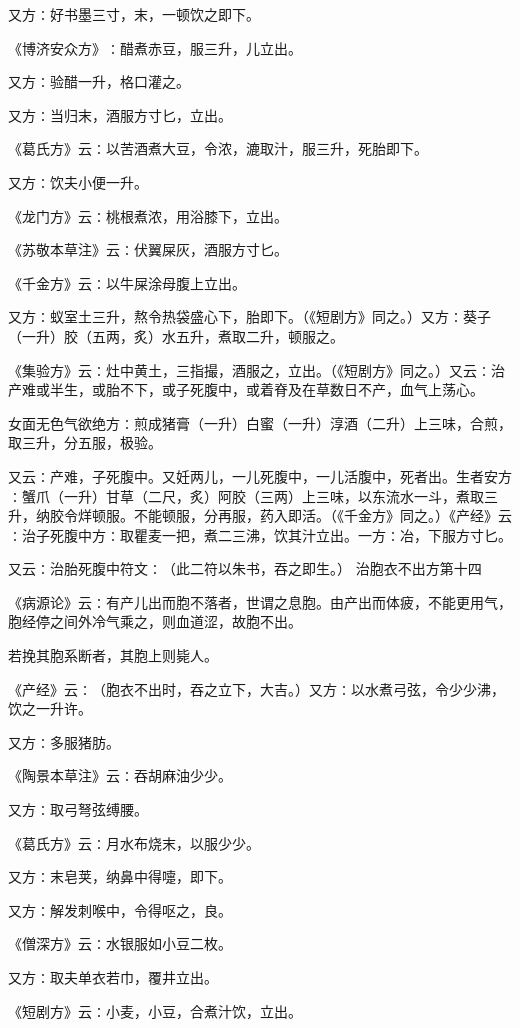 \documentclass[a4paper,12pt,UTF8,twoside]{ctexbook}
\begin{document}
又方∶好书墨三寸，末，一顿饮之即下。

《博济安众方》∶醋煮赤豆，服三升，儿立出。

又方∶验醋一升，格口灌之。

又方∶当归末，酒服方寸匕，立出。

《葛氏方》云∶以苦酒煮大豆，令浓，漉取汁，服三升，死胎即下。

又方∶饮夫小便一升。

《龙门方》云∶桃根煮浓，用浴膝下，立出。

《苏敬本草注》云∶伏翼屎灰，酒服方寸匕。

《千金方》云∶以牛屎涂母腹上立出。

又方∶蚁室土三升，熬令热袋盛心下，胎即下。（《短剧方》同之。）又方∶葵子（一升）胶（五两，炙）水五升，煮取二升，顿服之。

《集验方》云∶灶中黄土，三指撮，酒服之，立出。（《短剧方》同之。）又云∶治产难或半生，或胎不下，或子死腹中，或着脊及在草数日不产，血气上荡心。

女面无色气欲绝方∶煎成猪膏（一升）白蜜（一升）淳酒（二升）上三味，合煎，取三升，分五服，极验。

又云∶产难，子死腹中。又妊两儿，一儿死腹中，一儿活腹中，死者出。生者安方∶蟹爪（一升）甘草（二尺，炙）阿胶（三两）上三味，以东流水一斗，煮取三升，纳胶令烊顿服。不能顿服，分再服，药入即活。（《千金方》同之。）《产经》云∶治子死腹中方∶取瞿麦一把，煮二三沸，饮其汁立出。一方∶冶，下服方寸匕。

又云∶治胎死腹中符文∶（此二符以朱书，吞之即生。）
治胞衣不出方第十四

《病源论》云∶有产儿出而胞不落者，世谓之息胞。由产出而体疲，不能更用气，胞经停之间外冷气乘之，则血道涩，故胞不出。

若挽其胞系断者，其胞上则毙人。

《产经》云∶（胞衣不出时，吞之立下，大吉。）又方∶以水煮弓弦，令少少沸，饮之一升许。

又方∶多服猪肪。

《陶景本草注》云∶吞胡麻油少少。

又方∶取弓弩弦缚腰。

《葛氏方》云∶月水布烧末，以服少少。

又方∶末皂荚，纳鼻中得嚏，即下。

又方∶解发刺喉中，令得呕之，良。

《僧深方》云∶水银服如小豆二枚。

又方∶取夫单衣若巾，覆井立出。

《短剧方》云∶小麦，小豆，合煮汁饮，立出。
\end{document}
